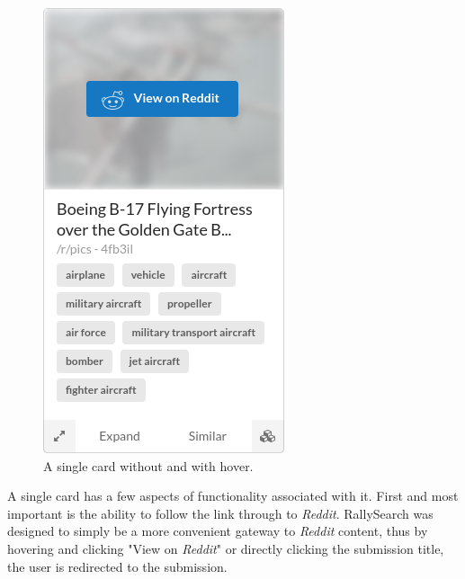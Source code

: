 \documentclass[msc,oneside]{ubcthesis}%
\begin{document}
\begin{figure}[H]
\begin{multicols}{2}
    \includegraphics[width=\linewidth]{card_hover.png}\par 
\end{multicols}
\caption{A single card without and with hover.}
\end{figure}
A single card has a few aspects of functionality associated with it. First and most important is the ability to follow the link through to \textit{Reddit}. RallySearch was designed to simply be a more convenient gateway to \textit{Reddit} content, thus by hovering and clicking "View on \textit{Reddit}" or directly clicking the submission title, the user is redirected to the submission.
\end{document}

